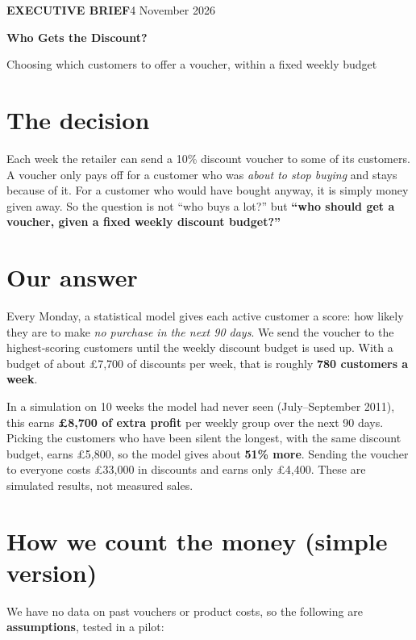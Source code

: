 \documentclass[a4paper,10pt]{article}
\begin{document}
\fontsize{10.2}{12.8}\selectfont
{\fontsize{9}{11}\selectfont\color{muted}\textbf{EXECUTIVE BRIEF}\hfill 4 November 2026}\par
\vspace{0.15cm}
{\fontsize{25}{28}\selectfont\bfseries\color{navy}Who Gets the Discount?}\par
\vspace{0.08cm}
{\fontsize{12}{15}\selectfont\color{muted}Choosing which customers to offer a voucher, within a fixed weekly budget}\par
\vspace{0.15cm}{\color{navy}\hrule}\vspace{0.12cm}

\section*{The decision}
Each week the retailer can send a 10\% discount voucher to some of its customers. A voucher only pays off for a customer who was \emph{about to stop buying} and stays because of it. For a customer who would have bought anyway, it is simply money given away. So the question is not ``who buys a lot?'' but \textbf{``who should get a voucher, given a fixed weekly discount budget?''}

\section*{Our answer}
Every Monday, a statistical model gives each active customer a score: how likely they are to make \emph{no purchase in the next 90 days}. We send the voucher to the highest-scoring customers until the weekly discount budget is used up. With a budget of about \pounds7,700 of discounts per week, that is roughly \textbf{780 customers a week}.

In a simulation on 10 weeks the model had never seen (July--September 2011), this earns \textbf{\pounds8,700 of extra profit} per weekly group over the next 90 days. Picking the customers who have been silent the longest, with the same discount budget, earns \pounds5,800, so the model gives about \textbf{51\% more}. Sending the voucher to everyone costs \pounds33,000 in discounts and earns only \pounds4,400. These are simulated results, not measured sales.

\section*{How we count the money (simple version)}
We have no data on past vouchers or product costs, so the following are \textbf{assumptions}, tested in a pilot:
\end{document}
